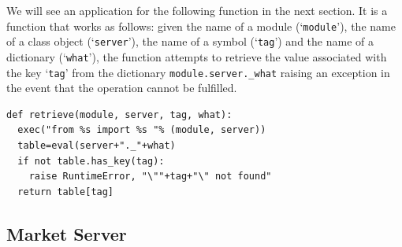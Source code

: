 We will see an application for the following function in the next
section. It is a function that works as follows: given the name of a
module (`\verb|module|'), the name of a class object
(`\verb|server|'), the name of a symbol (`\verb|tag|') and the name of
a dictionary (`\verb|what|'), the function attempts to retrieve the
value associated with the key `\verb|tag|' from the dictionary
\verb|module.server._what| raising an exception in the event that the
operation cannot be fulfilled.
\begin{verbatim}
def retrieve(module, server, tag, what):
  exec("from %s import %s "% (module, server))
  table=eval(server+"._"+what)
  if not table.has_key(tag):
    raise RuntimeError, "\""+tag+"\" not found"
  return table[tag]
\end{verbatim}

\subsection{Market Server}\label{subsec:market-server}

